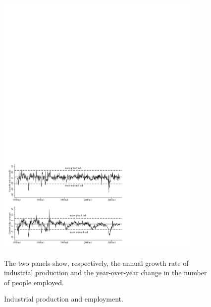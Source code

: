 \begin{figure}[h!]
     \caption{Industrial production and employment.}
    \label{fig:ip_emp}%
    \centering
    \includegraphics[width=0.9\textwidth]{Figures/scorecard_1.pdf}
    \begin{minipage}{0.85\textwidth}
    {\footnotesize The two panels show, respectively,
    the annual growth rate of industrial production and
    the year-over-year change in the number of people employed.}
    \end{minipage}
\end{figure}

